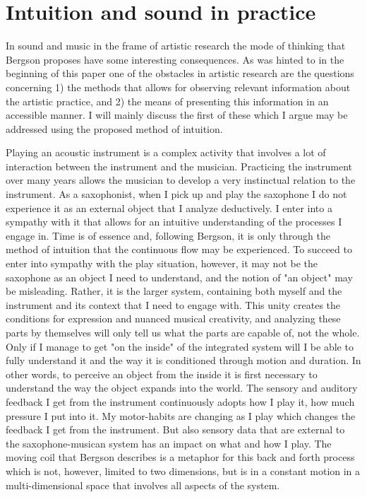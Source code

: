 \documentclass[11pt]{article}
\begin{document}
\section*{Intuition and sound in practice}
\label{sec:org3869fda}
In sound and music in the frame of artistic research the mode of thinking that Bergson proposes have some interesting consequences.
As was hinted to in the beginning of this paper one of the obstacles in artistic research are the questions concerning 1) the methods that allows for observing relevant information about the artistic practice, and 2) the means of presenting this information in an accessible manner.
I will mainly discuss the first of these which I argue may be addressed using the proposed method of intuition.

Playing an acoustic instrument is a complex activity that involves a lot of interaction between the instrument and the musician. Practicing the instrument over many years allows the musician to develop a very instinctual relation to the instrument. As a saxophonist, when I pick up and play the saxophone I do not experience it as an external object that I analyze deductively. I enter into a sympathy with it that allows for an intuitive understanding of the processes I engage in. Time is of essence and, following Bergson, it is only through the method of intuition that the continuous flow may be experienced.
To succeed to enter into sympathy with the play situation, however, it may not be the saxophone as an object I need to understand, and the notion of "an object" may be misleading.
Rather, it is the larger system, containing both myself and the instrument and its context that I need to engage with.
This unity creates the conditions for expression and nuanced musical creativity, and analyzing these parts by themselves will only tell us what the parts are capable of, not the whole.
Only if I manage to get "on the inside" of the integrated system will I be able to fully understand it and the way it is conditioned through motion and duration.
In other words, to perceive an object from the inside it is first necessary to understand the way the object expands into the world.
The sensory and auditory feedback I get from the instrument continuously adopts how I play it, how much pressure I put into it.
My motor-habits are changing as I play which changes the feedback I get from the instrument.
But also sensory data that are external to the saxophone-musican system has an impact on what and how I play.
The moving coil that Bergson describes is a metaphor for this back and forth process which is not, however, limited to two dimensions, but is in a constant motion in a multi-dimensional space that involves all aspects of the system.
\end{document}

